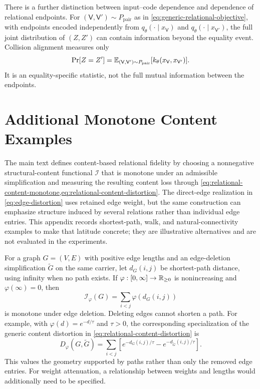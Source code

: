 There is a further distinction between input--code dependence and dependence of relational endpoints.
For $(\mathsf V,\mathsf V')\sim P_{\mathrm{pair}}$ as in \cref{eq:generic-relational-objective}, with endpoints encoded independently from $q_\theta(\cdot\mid x_{\mathsf V})$ and $q_\theta(\cdot\mid x_{\mathsf V'})$, the full joint distribution of $(Z,Z')$ can contain information beyond the equality event.
Collision alignment measures only
\begin{equation}
\Pr[Z=Z']=\mathbb{E}_{(\mathsf V,\mathsf V')\sim P_{\mathrm{pair}}}[k_\theta(x_{\mathsf V},x_{\mathsf V'})].
\end{equation}
It is an equality-specific statistic, not the full mutual information between the endpoints.

\section{Additional Monotone Content Examples}
\label{app:path-walk-content}

The main text defines content-based relational fidelity by choosing a nonnegative structural-content functional $\mathcal I$ that is monotone under an admissible simplification and measuring the resulting content loss through \cref{eq:relational-content-monotone,eq:relational-content-distortion}.
The direct-edge realization in \cref{eq:edge-distortion} uses retained edge weight, but the same construction can emphasize structure induced by several relations rather than individual edge entries.
This appendix records shortest-path, walk, and natural-connectivity examples to make that latitude concrete; they are illustrative alternatives and are not evaluated in the experiments.

For a graph $G=(V,E)$ with positive edge lengths and an edge-deletion simplification $\widetilde G$ on the same carrier, let $d_G(i,j)$ be shortest-path distance, using infinity when no path exists.
If $\varphi:[0,\infty]\to\mathbb{R}_{\ge0}$ is nonincreasing and $\varphi(\infty)=0$, then
\begin{equation}
\mathcal I_\varphi(G)=\sum_{i<j}\varphi(d_G(i,j))
\end{equation}
is monotone under edge deletion.
Deleting edges cannot shorten a path.
For example, with $\varphi(d)=e^{-d/\tau}$ and $\tau>0$, the corresponding specialization of the generic content distortion in \cref{eq:relational-content-distortion} is
\begin{equation}
D_\varphi(G,\widetilde G)
=\sum_{i<j}\left[e^{-d_G(i,j)/\tau}-e^{-d_{\widetilde G}(i,j)/\tau}\right].
\end{equation}
This values the geometry supported by paths rather than only the removed edge entries.
For weight attenuation, a relationship between weights and lengths would additionally need to be specified.

